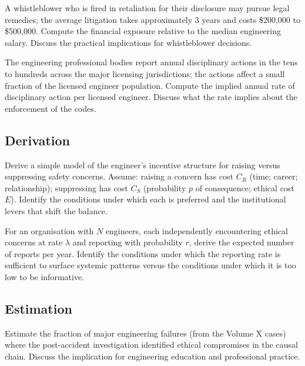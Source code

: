 \begin{exercise}
A whistleblower who is fired in retaliation for their disclosure may pursue legal remedies; the average litigation takes approximately 3 years and costs \$200{,}000 to \$500{,}000. Compute the financial exposure relative to the median engineering salary. Discuss the practical implications for whistleblower decisions.
\end{exercise}

\begin{exercise}
The engineering professional bodies report annual disciplinary actions in the tens to hundreds across the major licensing jurisdictions; the actions affect a small fraction of the licensed engineer population. Compute the implied annual rate of disciplinary action per licensed engineer. Discuss what the rate implies about the enforcement of the codes.
\end{exercise}

\subsection*{Derivation}

\begin{exercise}
Derive a simple model of the engineer's incentive structure for raising versus suppressing safety concerns. Assume: raising a concern has cost $C_R$ (time; career; relationship); suppressing has cost $C_S$ (probability $p$ of consequence; ethical cost $E$). Identify the conditions under which each is preferred and the institutional levers that shift the balance.
\end{exercise}

\begin{exercise}
For an organisation with $N$ engineers, each independently encountering ethical concerns at rate $\lambda$ and reporting with probability $r$, derive the expected number of reports per year. Identify the conditions under which the reporting rate is sufficient to surface systemic patterns versus the conditions under which it is too low to be informative.
\end{exercise}

\subsection*{Estimation}

\begin{exercise}
Estimate the fraction of major engineering failures (from the Volume X cases) where the post-accident investigation identified ethical compromises in the causal chain. Discuss the implication for engineering education and professional practice.
\end{exercise}

